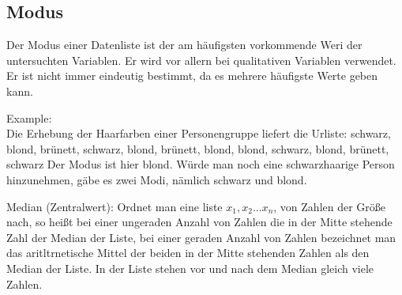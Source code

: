 \subsection{Modus}

Der Modus einer Datenliste ist der am häufigsten vorkommende Weri der untersuchten Variablen.
Er wird vor allern bei qualitativen Variablen verwendet. Er ist nicht immer eindeutig bestimmt, da es mehrere häufigste Werte geben kann.

\hfill \break
Example:\\
Die Erhebung der Haarfarben einer Personengruppe liefert die Urliste: 
schwarz, blond, brünett, schwarz, blond, brünett, blond, blond, schwarz, blond, brünett, schwarz 
Der Modus ist hier blond. Würde man noch eine schwarzhaarige Person hinzunehmen, 
gäbe es zwei Modi, nämlich schwarz und blond. 

\hfill \break
Median (Zentralwert): Ordnet man eine liste $x_1,x_2 ... x_n$, von Zahlen der Größe nach, so heißt 
bei einer ungeraden Anzahl von Zahlen die in der Mitte stehende Zahl der Median der Liste, bei 
einer geraden Anzahl von Zahlen bezeichnet man das aritltrnetische Mittel der beiden in der 
Mitte stehenden Zahlen als den Median der Liste. In der Liste stehen vor und nach dem Median 
gleich viele Zahlen. 
